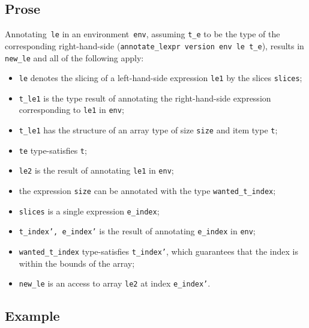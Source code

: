 \documentclass{book}
\begin{document}
  \subsection{Prose}
   Annotating~\texttt{le} in an environment~\texttt{env}, assuming
\texttt{t\_e} to be the type of the corresponding right-hand-side
(\texttt{annotate\_lexpr version env le t\_e}), results in \texttt{new\_le} and
all of the following apply:
   \begin{itemize}
   \item \texttt{le} denotes the slicing of a left-hand-side expression \texttt{le1} by the slices \texttt{slices};
   \item \texttt{t\_le1} is the type result of annotating the right-hand-side expression corresponding to \texttt{le1} in \texttt{env};
   \item \texttt{t\_le1} has the structure of an array type of size \texttt{size} and item type \texttt{t};
   \item \texttt{te} type-satisfies \texttt{t};
   \item \texttt{le2} is the result of annotating \texttt{le1} in \texttt{env};
  \item the expression \texttt{size} can be annotated with the type \texttt{wanted\_t\_index};
  \item \texttt{slices} is a single expression \texttt{e\_index};
   \item \texttt{t\_index', e\_index'} is the result of annotating \texttt{e\_index} in \texttt{env};
   \item \texttt{wanted\_t\_index} type-satisfies \texttt{t\_index'}, which guarantees that the index
   is within the bounds of the array;
   \item \texttt{new\_le} is an access to array \texttt{le2} at index \texttt{e\_index'}.
   \end{itemize}

  \subsection{Example}
\end{document}
